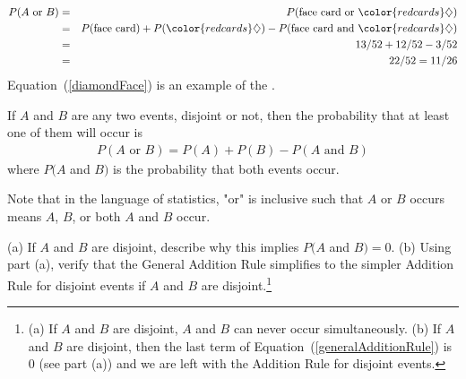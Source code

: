 \begin{eqnarray}
P(A\text{ or } B) &=&P(\text{face card or }{\color{redcards}\diamondsuit})  \notag \\
 &=& P(\text{face card}) + P({\color{redcards}\diamondsuit}) - P(\text{face card and }{\color{redcards}\diamondsuit}) \label{diamondFace} \\
 &=& 13/52 + 12/52 - 3/52 \notag \\
 &=& 22/52 = 11/26 \notag
\end{eqnarray}
Equation~(\ref{diamondFace}) is an example of the . 

\begin{termBox}{ If $A$ and $B$ are any two events, disjoint or not, then the probability that at least one of them will occur is
\begin{eqnarray}
P(A\text{ or }B) = P(A) + P(B) - P(A\text{ and }B)
\label{generalAdditionRule}
\end{eqnarray}
where $P(A$ and $B)$ is the probability that both events occur.}
\end{termBox}

Note that in the language of statistics, "or" is inclusive such that $A$ or $B$ occurs means $A$, $B$, or both $A$ and $B$ occur.

\begin{exercise}
(a) If $A$ and $B$ are disjoint, describe why this implies $P(A$ and $B) = 0$. (b) Using part (a), verify that the General Addition Rule simplifies to the simpler Addition Rule for disjoint events if $A$ and $B$ are disjoint.\footnote{(a) If $A$ and $B$ are disjoint, $A$ and $B$ can never occur simultaneously. (b) If $A$ and $B$ are disjoint, then the last term of Equation~(\ref{generalAdditionRule}) is 0 (see part (a)) and we are left with the Addition Rule for disjoint events.}
\end{exercise}


